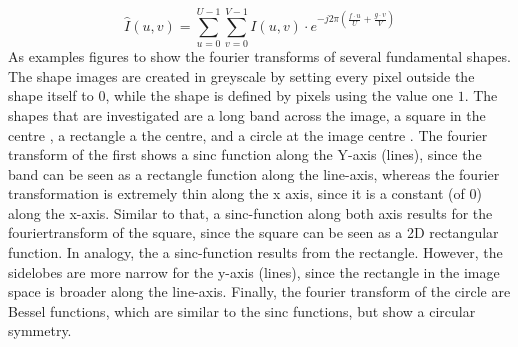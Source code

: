 \begin{equation*}
\hat{I}(u,v)=\sum^{U-1}_{u=0}\sum^{V-1}_{v=0} I\left(u,v\right)\cdot e^{-j2\pi\left(\frac{f\cdot u}{U}+\frac{g\cdot v}{V}\right)}
\end{equation*}
As examples figures to show the fourier transforms of several fundamental shapes. The shape images are created in greyscale by setting every pixel outside the shape itself to $0$, while the shape is defined by pixels using the value one $1$. The shapes that are investigated are a long band across the image, a square in the centre , a rectangle a the centre, and a circle at the image centre . The fourier transform of the first shows a sinc function along the Y-axis (lines), since the band can be seen as a rectangle function along the line-axis, whereas the fourier transformation is extremely thin along the x axis, since it is a constant (of 0) along the x-axis. Similar to that, a sinc-function along both axis results for the fouriertransform of the square, since the square can be seen as a 2D rectangular function. In analogy, the a sinc-function results from the rectangle. However, the sidelobes are more narrow for the y-axis (lines), since the rectangle in the image space is broader along the line-axis. Finally, the fourier transform of the circle are Bessel functions, which are similar to the sinc functions, but show a circular symmetry. 




